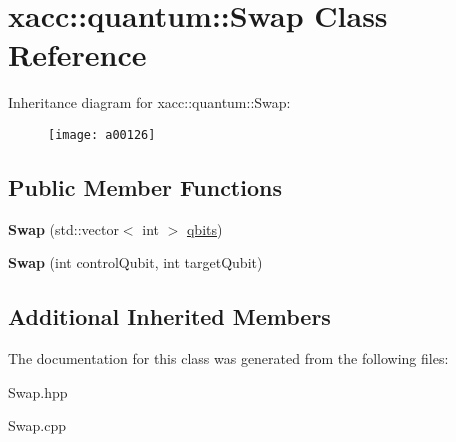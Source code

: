 \hypertarget{a00126}{}\section{xacc\+:\+:quantum\+:\+:Swap Class Reference}
\label{a00126}
Inheritance diagram for xacc\+:\+:quantum\+:\+:Swap\+:\begin{figure}[H]
\begin{center}
\leavevmode
\texttt{[image: a00126]}
\end{center}
\end{figure}
\subsection*{Public Member Functions}
\begin{DoxyCompactItemize}
\item 
{\bfseries Swap} (std\+::vector$<$ int $>$ \hyperlink{a00062_a2a56be6c2519ea65df4d06f4abae1393}{qbits})\hypertarget{a00126_a5c35a23a635f235a5615be65e769c121}{}\label{a00126_a5c35a23a635f235a5615be65e769c121}

\item 
{\bfseries Swap} (int control\+Qubit, int target\+Qubit)\hypertarget{a00126_ac19efe303b798e14441a2c235b5ba7f3}{}\label{a00126_ac19efe303b798e14441a2c235b5ba7f3}

\end{DoxyCompactItemize}
\subsection*{Additional Inherited Members}


The documentation for this class was generated from the following files\+:\begin{DoxyCompactItemize}
\item 
Swap.\+hpp\item 
Swap.\+cpp\end{DoxyCompactItemize}
